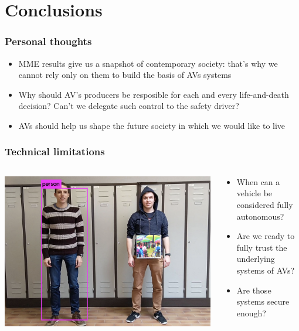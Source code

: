 \documentclass[aspectratio=169]{beamer}
\begin{document}
\begin{frame}
\begin{columns}[totalwidth=1.0\textwidth]
\begin{column}{0.35\linewidth}
        \end{column}
    \end{columns}
\end{frame}

\section{Conclusions}
\begin{frame}
    \frametitle{Personal thoughts}
    \begin{itemize}
        \item MME results give us a snapshot of contemporary society: that's why we cannot rely only on them to build the basis of AVs systems
        \item Why should AV's producers be resposible for each and every life-and-death decision? Can't we delegate such control to the safety driver? \cite{ethical-knob}
        \item AVs should help us shape the future society in which we would like to live
    \end{itemize}
\end{frame}

\begin{frame}
    \frametitle{Technical limitations}
    \begin{columns}[totalwidth=1.0\textwidth]
        \begin{column}{0.5\linewidth}
            \includegraphics[width=1.0\linewidth]{assets/adversarial-attack.png}
        \end{column}
        \begin{column}{0.5\linewidth}
            \begin{itemize}
                \item When can a vehicle be considered fully autonomous?
                \item Are we ready to fully trust the underlying systems of AVs?
                \item Are those systems secure enough?
            \end{itemize}
        \end{column}
    \end{columns}
\end{frame}
\end{document}
